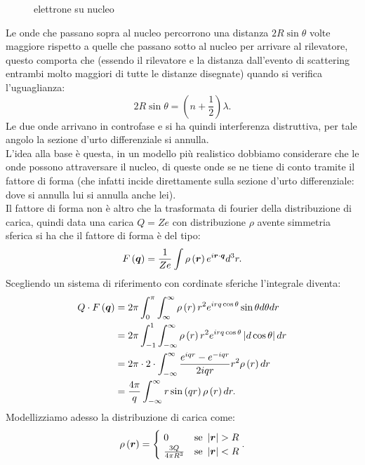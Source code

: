 \begin{figure}[H]
    \centering
    \caption{elettrone su nucleo}
    \label{fig:elettrone-su-nucleo-fattore-forma}
\end{figure}
Le onde che passano sopra al nucleo percorrono una distanza $2R\sin\theta$ volte maggiore rispetto a quelle che passano sotto al nucleo per arrivare al rilevatore, questo comporta che (essendo il rilevatore e la distanza dall'evento di scattering entrambi molto maggiori di tutte le distanze disegnate) quando si verifica l'uguaglianza:
\[
	2R\sin\theta = \left( n + \frac{1}{2} \right)\lambda 
.\] 
Le due onde arrivano in controfase e si ha quindi interferenza distruttiva, per tale angolo la sezione d'urto differenziale si annulla.\\
L'idea alla base è questa, in un modello più realistico dobbiamo considerare che le onde possono attraversare il nucleo, di queste onde se ne tiene di conto tramite il fattore di forma (che infatti incide direttamente sulla sezione d'urto differenziale: dove si annulla lui si annulla anche lei).\\
Il fattore di forma non è altro che la trasformata di fourier della distribuzione di carica, quindi data una carica $Q = Ze$ con distribuzione $\rho$ avente simmetria sferica si ha che il fattore di forma è del tipo: 
\[
	F\left( \boldsymbol{q} \right) = \frac{1}{Ze}\int \rho\left( \boldsymbol{r} \right) e^{i \boldsymbol{r}\cdot \boldsymbol{q}}d^3r
.\] 
Scegliendo un sistema di riferimento con cordinate sferiche l'integrale diventa:
\begin{align*}
	Q \cdot F\left( \boldsymbol{q} \right) &= 2\pi \int_{0}^{\pi} \int_{\infty}^{\infty}\rho\left( r \right) r^2e^{i rq \cos\theta}\sin\theta d\theta dr\\
	&=  2\pi \int_{-1}^{1} \int_{-\infty}^{\infty}\rho\left( r \right) r^2e^{i rq \cos\theta}\left|d\cos\theta\right|dr\\
	&=  2\pi\cdot  2 \cdot \int_{-\infty}^{\infty} \frac{e^{iqr}-e^{-iqr}}{2iqr} r^2 \rho\left( r \right) dr  \\
	&=  \frac{4\pi}{q} \int_{-\infty}^{\infty} r\sin\left( qr \right) \rho\left( r \right) dr 
.\end{align*}
Modellizziamo adesso la distribuzione di carica come:
\[
	\rho\left( \boldsymbol{r} \right) = 
	\begin{cases}
		\ 0 & \text{se } \left| \boldsymbol{r} \right| > R \\ 
		\ \frac{3Q}{4\pi R^3} & \text{se } \left| \boldsymbol{r} \right| < R 
	\end{cases}
.\] 
